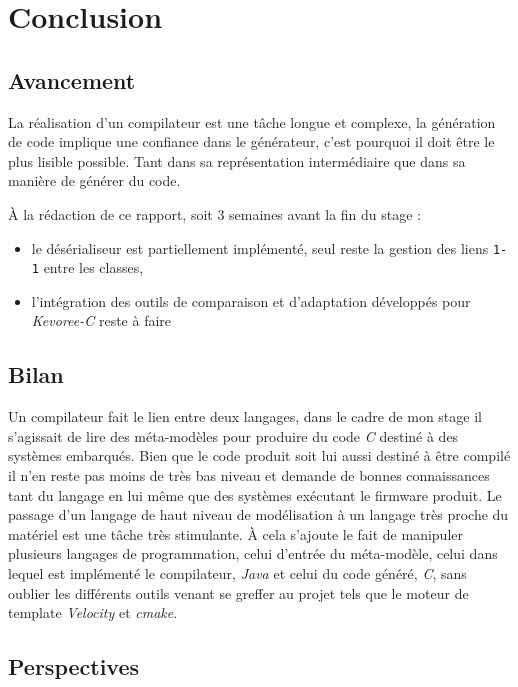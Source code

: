 \section*{Conclusion}
{}

\subsection*{Avancement}
{}
La réalisation d'un compilateur est une tâche longue et complexe, la génération de code implique une confiance dans le générateur, c'est pourquoi il doit être le plus lisible possible. Tant dans sa représentation intermédiaire que dans sa manière de générer du code.

À la rédaction de ce rapport, soit 3 semaines avant la fin du stage :
\begin{itemize}
\item le désérialiseur est partiellement implémenté, seul reste la gestion des liens \texttt{1-1} entre les classes,
\item l'intégration des outils de comparaison et d'adaptation développés pour \emph{Kevoree-C} reste à faire
\end{itemize}

\subsection*{Bilan}
{}

Un compilateur fait le lien entre deux langages, dans le cadre de mon stage il s'agissait de lire des méta-modèles pour produire du code \emph{C} destiné à des systèmes embarqués. Bien que le code produit soit lui aussi destiné à être compilé il n'en reste pas moins de très bas niveau et demande de bonnes connaissances tant du langage en lui même que des systèmes exécutant le firmware produit.
Le passage d'un langage de haut niveau de modélisation à un langage très proche du matériel est une tâche très stimulante. À cela s'ajoute le fait de manipuler plusieurs langages de programmation, celui d'entrée du méta-modèle, celui dans lequel est implémenté le compilateur, \emph{Java} et celui du code généré, \emph{C}, sans oublier les différents outils venant se greffer au projet tels que le moteur de template \emph{Velocity} et \emph{cmake}.


\subsection*{Perspectives}
{}

